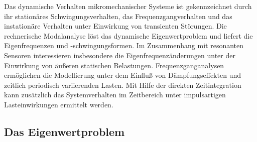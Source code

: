 Das dynamische Verhalten mikromechanischer Systeme ist gekennzeichnet durch
ihr sta\-tionäres Schwingungsverhalten, das Frequenzgangverhalten und das
instationäre Verhalten unter Einwirkung von transienten Störungen. Die
rechnerische Modalanalyse löst das dynamische Eigenwertproblem und liefert
die Eigenfrequenzen und -schwingungsformen. Im Zusammenhang mit resonanten
Sensoren interessieren insbesondere die Eigenfrequenzänderungen unter der
Einwirkung von äußeren statischen Belastungen. Frequenzganganalysen
ermöglichen die Modellierung unter dem Einfluß von Dämpfungseffekten und
zeitlich periodisch variierenden Lasten. Mit Hilfe der direkten
Zeitintegration kann zusätzlich das Systemverhalten im Zeitbereich unter
impulsartigen Lasteinwirkungen ermittelt werden.


\subsection{Das Eigenwertproblem}
\label{eigenwertproblem}

